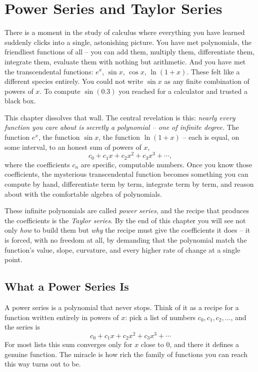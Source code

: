\chapter{Power Series and Taylor Series}

There is a moment in the study of calculus where everything you have learned suddenly clicks into a single, astonishing picture. You have met polynomials, the friendliest functions of all -- you can add them, multiply them, differentiate them, integrate them, evaluate them with nothing but arithmetic. And you have met the transcendental functions: $e^x$, $\sin x$, $\cos x$, $\ln(1+x)$. These felt like a different species entirely. You could not write $\sin x$ as any finite combination of powers of $x$. To compute $\sin(0.3)$ you reached for a calculator and trusted a black box.

This chapter dissolves that wall. The central revelation is this: \emph{nearly every function you care about is secretly a polynomial -- one of infinite degree.} The function $e^x$, the function $\sin x$, the function $\ln(1+x)$ -- each is equal, on some interval, to an honest sum of powers of $x$,
\[
  c_0 + c_1 x + c_2 x^2 + c_3 x^3 + \cdots,
\]
where the coefficients $c_n$ are specific, computable numbers. Once you know those coefficients, the mysterious transcendental function becomes something you can compute by hand, differentiate term by term, integrate term by term, and reason about with the comfortable algebra of polynomials.

These infinite polynomials are called \emph{power series}, and the recipe that produces the coefficients is the \emph{Taylor series}. By the end of this chapter you will see not only \emph{how} to build them but \emph{why} the recipe must give the coefficients it does -- it is forced, with no freedom at all, by demanding that the polynomial match the function's value, slope, curvature, and every higher rate of change at a single point.

\section{What a Power Series Is}
\label{ch30:sec-what}

\begin{intuitionbox}
A power series is a polynomial that never stops. Think of it as a recipe for a function written entirely in powers of $x$: pick a list of numbers $c_0, c_1, c_2, \dots$, and the series is
\[
  c_0 + c_1 x + c_2 x^2 + c_3 x^3 + \cdots
\]
For most lists this sum converges only for $x$ close to $0$, and there it defines a genuine function. The miracle is how rich the family of functions you can reach this way turns out to be.
\end{intuitionbox}

